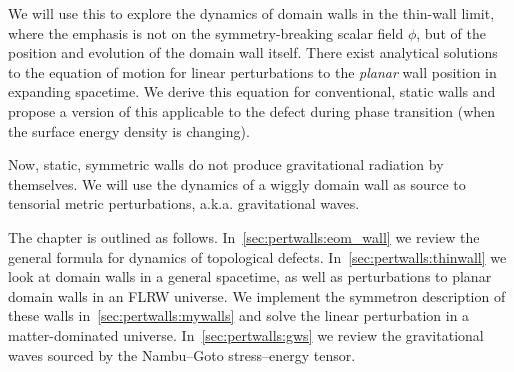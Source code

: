
We will use this to explore the dynamics of domain walls in the thin-wall limit, where the emphasis is not on the symmetry-breaking scalar field $\phi$, but of the position and evolution of the domain wall itself. There exist analytical solutions to the equation of motion for linear perturbations to the \emph{planar} wall position in expanding spacetime. We derive this equation for conventional, static walls and propose a version of this applicable to the defect during phase transition (when the surface energy density is changing). 

Now, static, symmetric walls do not produce gravitational radiation by themselves. We will use the dynamics of a wiggly domain wall as source to tensorial metric perturbations, a.k.a. gravitational waves.








The chapter is outlined as follows. In~\cref{sec:pertwalls:eom_wall} we review the general formula for dynamics of topological defects. In~\cref{sec:pertwalls:thinwall} we look at domain walls in a general spacetime, as well as perturbations to planar domain walls in an FLRW universe. We implement the symmetron description of these walls in~\cref{sec:pertwalls:mywalls} and solve the linear perturbation in a matter-dominated universe. In~\cref{sec:pertwalls:gws} we review the gravitational waves sourced by the Nambu--Goto stress--energy tensor.












